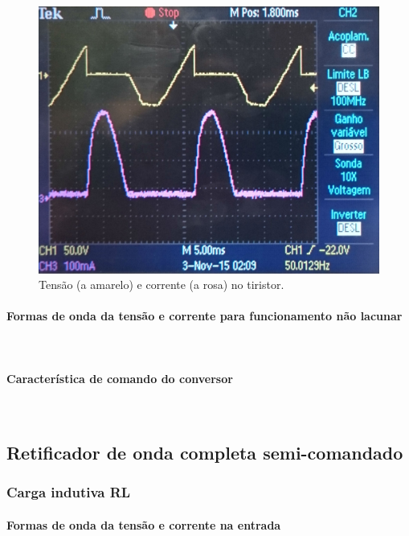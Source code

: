 \documentclass[a4paper,11pt]{article}
\numberwithin{equation}{section}
\begin{document}
\begin{figure}[H]
	\centering
	\includegraphics[keepaspectratio=true, scale=0.15]{img/DSC_0185}
	\caption{Tensão (a amarelo) e corrente (a rosa) no tiristor.}
	\label{fig:tctiristorlacuna}
	\vspace{-0.8em}
\end{figure}

\paragraph{Formas de onda da tensão e corrente para funcionamento não lacunar} \mbox{}\

\paragraph{Característica de comando do conversor} \mbox{}\

\subsection{Retificador de onda completa semi-comandado}

\subsubsection{Carga indutiva RL}

\paragraph{Formas de onda da tensão e corrente na entrada} \mbox{}\
\end{document}
